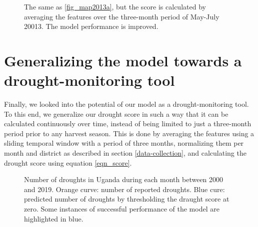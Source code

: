 \documentclass[10pt,parskip=half,
toc=sectionentrywithdots,
bibliography=totocnumbered,
captions=tableheading,numbers=noendperiod]{scrartcl}
\begin{document}
\begin{figure}[H]\begin{center}\end{center}\caption{The same as \ref{fig_map2013a}, but the score is calculated by averaging
the features over the three-month period of May-July 20013. The model
performance is improved.}\label{fig_map2013b}\end{figure}

\hypertarget{generalizing-the-model-towards-a-drought-monitoring-tool}{%
\section{Generalizing the model towards a drought-monitoring
tool}\label{generalizing-the-model-towards-a-drought-monitoring-tool}}

Finally, we looked into the potential of our model as a
drought-monitoring tool. To this end, we generalize our drought score in
such a way that it can be calculated continuously over time, instead of
being limited to just a three-month period prior to any harvest season.
This is done by averaging the features using a sliding temporal window
with a period of three months, normalizing them per month and district
as described in section \ref{data-collection}, and calculating the
drought score using equation \ref{eqn_score}.

\begin{figure}[H]\begin{center}\end{center}\caption{Number of droughts in Uganda during each month between 2000 and 2019.
Orange curve: number of reported droughts. Blue cure: predicted number
of droughts by thresholding the draught score at zero. Some instances of
successful performance of the model are highlighted in blue.}\label{fig_droughtcount}\end{figure}
\end{document}
